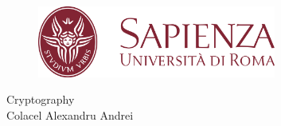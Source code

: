 \documentclass{book}
\title{}
\author{}
\date{\today}
\begin{document}
\raggedbottom %

\pagestyle{fancy}
\fancyhf{}
\rfoot{\thepage}
\lhead{\quad \leftmark}
\rhead{ \quad \rightmark}

\renewcommand{\headrulewidth}{0.2pt}

\begin{titlepage}
    \begin{figure}[t]
        \centering
        \includegraphics[width=0.7\textwidth]{drawings/logo_sapienza_new.png}
        \label{fig:logo}
    \end{figure}    
    \null\vfill
    \begin{center}
      {\Huge Cryptography} \\[2cm]
      {\Large Colacel Alexandru Andrei}
    \end{center}
    \vfill\null
    \renewcommand{\abstractname}{Disclaimer}
  \end{titlepage}

\tableofcontents



\end{document}
